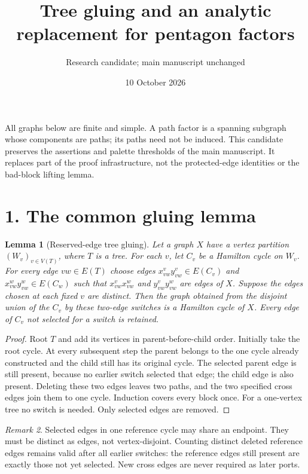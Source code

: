 \documentclass[11pt]{article}
\title{Tree gluing and an analytic replacement for pentagon factors}
\author{Research candidate; main manuscript unchanged}
\date{10 October 2026}
\newtheorem{lemma}{Lemma}
\theoremstyle{remark}\newtheorem{remark}[lemma]{Remark}
\begin{document}
\maketitle

All graphs below are finite and simple. A path factor is a spanning
subgraph whose components are paths; its paths need not be induced.
This candidate preserves the assertions and palette thresholds of the
main manuscript. It replaces part of the proof infrastructure, not the
protected-edge identities or the bad-block lifting lemma.

\section*{1. The common gluing lemma}

\begin{lemma}[Reserved-edge tree gluing]\label{lem:tree-gluing}
Let a graph $X$ have a vertex partition $(W_v)_{v\in V(T)}$, where
$T$ is a tree. For each $v$, let $C_v$ be a Hamilton cycle on $W_v$.
For every edge $vw\in E(T)$ choose edges
$x_{vw}^vy_{vw}^v\in E(C_v)$ and
$x_{vw}^wy_{vw}^w\in E(C_w)$ such that
$x_{vw}^vx_{vw}^w$ and $y_{vw}^vy_{vw}^w$ are edges of $X$.
Suppose the edges chosen at each fixed $v$ are distinct.
Then the graph obtained from the disjoint union of the $C_v$ by
these two-edge switches is a Hamilton cycle of $X$.
Every edge of $C_v$ not selected for a switch is retained.
\end{lemma}
\begin{proof}
Root $T$ and add its vertices in parent-before-child order. Initially
take the root cycle. At every subsequent step the parent belongs to
the one cycle already constructed and the child still has its original
cycle. The selected parent edge is still present, because no earlier
switch selected that edge; the child edge is also present. Deleting
these two edges leaves two paths, and the two specified cross edges
join them to one cycle. Induction covers every block once. For a
one-vertex tree no switch is needed. Only selected edges are removed.
\end{proof}

\begin{remark}
Selected edges in one reference cycle may share an endpoint. They
must be distinct as edges, not vertex-disjoint. Counting distinct
deleted reference edges remains valid after all earlier switches:
the reference edges still present are exactly those not yet selected.
New cross edges are never required as later ports.
\end{remark}
\end{document}
